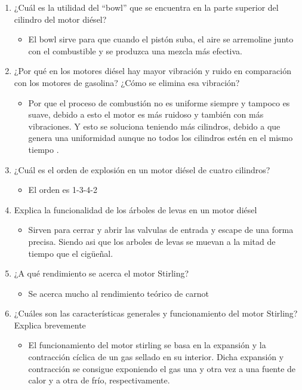 \documentclass{article}
\begin{document}
\begin{enumerate}
    \item ¿Cuál es la utilidad del “bowl” que se encuentra en la parte superior del cilindro del motor diésel?
        \begin{itemize}
            \item El bowl sirve para que cuando el pistón suba, el aire se arremoline junto con el combustible y se produzca una mezcla más efectiva. 
        \end{itemize}
    \item ¿Por qué en los motores diésel hay mayor vibración y ruido en comparación con los motores de gasolina?
    ¿Cómo se elimina esa vibración?
        \begin{itemize}
            \item Por que el proceso de combustión no es uniforme siempre y tampoco es suave, debido a esto el motor es más ruidoso y también con más vibraciones. Y esto se soluciona teniendo más cilindros, debido a que genera una uniformidad aunque no todos los cilindros estén en el mismo tiempo . 
        \end{itemize}
    \item ¿Cuál es el orden de explosión en un motor diésel de cuatro cilindros?
        \begin{itemize}
            \item El orden es 1-3-4-2 
        \end{itemize}
    \item Explica la funcionalidad de los árboles de levas en un motor diésel
        \begin{itemize}
            \item Sirven para cerrar y abrir las valvulas de entrada y escape de una forma precisa. Siendo asi que los arboles de levas se muevan a la mitad de tiempo que el cigüeñal. 
        \end{itemize}
    \item ¿A qué rendimiento se acerca el motor Stirling?
        \begin{itemize}
            \item Se acerca mucho al rendimiento teórico de carnot 
        \end{itemize}
    \item ¿Cuáles son las características generales y funcionamiento del motor Stirling? Explica brevemente
        \begin{itemize}
            \item El funcionamiento del motor stirling se basa en la expansión y la contracción cíclica de un gas sellado en su interior. Dicha expansión y contracción se consigue exponiendo el gas una y otra vez a una fuente de calor y a otra de frío, respectivamente.

\end{itemize}
\end{enumerate}
\end{document}
